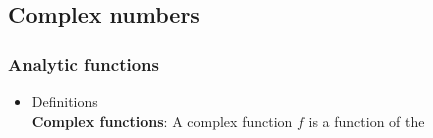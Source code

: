 \subsection{Complex numbers}



\subsubsection{Analytic functions}
\begin{itemize}
\item Definitions\\
\textbf{Complex functions}: A complex function $f$ is a function of the 
\end{itemize}